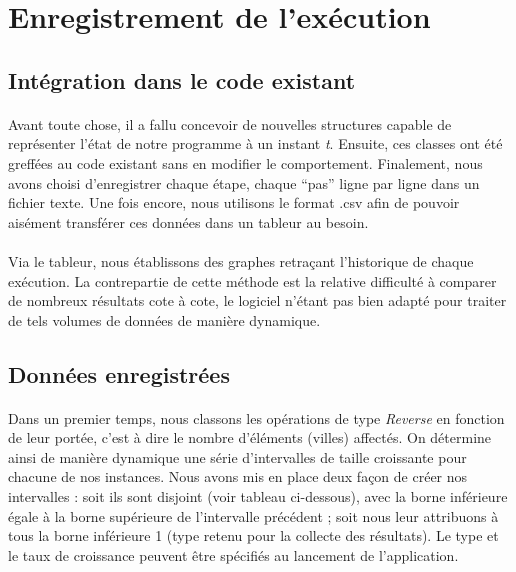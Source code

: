 \documentclass[a4paper,10pt]{report}
\begin{document}
\section{Enregistrement de l'exécution}
\subsection{Intégration dans le code existant}

\paragraph{}
  Avant toute chose, il a fallu concevoir de nouvelles structures capable de
représenter l'état de notre programme à un instant \textit{t}. Ensuite, ces
classes ont été greffées au code existant sans en modifier le comportement.
Finalement, nous avons choisi d'enregistrer chaque étape, chaque ``pas'' ligne
par ligne dans un fichier texte. Une fois encore, nous utilisons le format .csv
afin de pouvoir aisément transférer ces données dans un tableur au besoin.

\paragraph{}%
  Via le tableur, nous établissons des graphes retraçant l'historique de chaque
exécution. La contrepartie de cette méthode est la relative difficulté à
comparer de nombreux résultats cote à cote, le logiciel n'étant pas bien adapté
pour traiter de tels volumes de données de manière dynamique.

\subsection{Données enregistrées}

\paragraph{}
  Dans un premier temps, nous classons les opérations de type
\textit{Reverse} en fonction de leur portée, c'est à dire le nombre d'éléments
(villes) affectés. On détermine ainsi de manière dynamique une série
d'intervalles de taille croissante pour chacune de nos instances. Nous avons mis
en place deux façon de créer nos intervalles : soit ils sont disjoint (voir
tableau ci-dessous), avec la borne inférieure égale à la borne supérieure de
l'intervalle précédent ; soit nous leur attribuons à tous la borne inférieure 1
(type retenu pour la collecte des résultats). Le type et le taux de croissance
peuvent être spécifiés au lancement de l'application.
\end{document}
